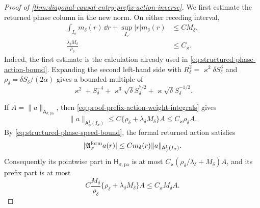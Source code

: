 \begin{proof}[Proof of
\cref{thm:diagonal-causal-entry-prefix-action-inverse}]
We first estimate the returned phase column in the new norm.  On either
receding interval,
\begin{align}
 \int_{I_\sigma}m_\delta(r)\,\dd r
   +\sup_{I_\sigma}|r|m_\delta(r)&\le C M_\delta,
                                                        \label{eq:proof-prefix-action-weight-integrals}\\
 \frac{\lambda_\delta M_\delta}{\rho_\delta}
 &\le C_\varkappa.                              \label{eq:proof-prefix-action-scale-ratio}
\end{align}
Indeed, the first estimate is the calculation already used in
\cref{eq:structured-phase-action-bound}.  Expanding the second left-hand
side with
\(R_\delta^2=\varkappa^2\delta S_\delta^3\) and
\(\rho_\delta=\delta S_\delta/(2\alpha)\) gives a bounded multiple of
\begin{equation*}
 \varkappa^2+S_\delta^{-4}
 +\varkappa^3\sqrt\delta S_\delta^{7/2}
 +\varkappa\sqrt\delta S_\delta^{-1/2}.
\end{equation*}

If \(A=\|a\|_{\mathsf A_{\sigma,\mathrm{pa}}}\), then
\cref{eq:proof-prefix-action-weight-integrals} gives
\begin{equation}
 \|a\|_{\mathsf A_\phi^1(I_\sigma)}
 \le C\{\rho_\delta+\lambda_\delta M_\delta\}A
 \le C_\varkappa\rho_\delta A.                 \label{eq:proof-prefix-action-A1-embedding}
\end{equation}
By \cref{eq:structured-phase-speed-bound}, the formal returned action
satisfies
\begin{equation}
 |\mathfrak A_\sigma^{\rm form}a(r)|
 \le C m_\delta(r)
       \|a\|_{\mathsf A_\phi^1(I_\sigma)}.       \label{eq:proof-prefix-action-formal-pointwise}
\end{equation}
Consequently its pointwise part in
\(\mathsf H_{\sigma,\mathrm{pa}}\) is at most
\(C_\varkappa(\rho_\delta/\lambda_\delta+M_\delta)A\),
and its prefix part is at most
\begin{equation*}
 C\frac{M_\delta}{\rho_\delta}
    \{\rho_\delta+\lambda_\delta M_\delta\}A
 \le C_\varkappa M_\delta A.
\end{equation*}


\end{proof}
